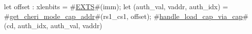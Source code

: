 let offset : xlenbits = #\hyperref[sailRISCVzEXTS]{EXTS}#(imm);
let (auth_val, vaddr, auth_idx) = #\hyperref[sailRISCVzgetzycherizymodezycapzyaddr]{get\_cheri\_mode\_cap\_addr}#(rs1_cs1, offset);
#\hyperref[sailRISCVzhandlezyloadzycapzyviazycap]{handle\_load\_cap\_via\_cap}#(cd, auth_idx, auth_val, vaddr)
